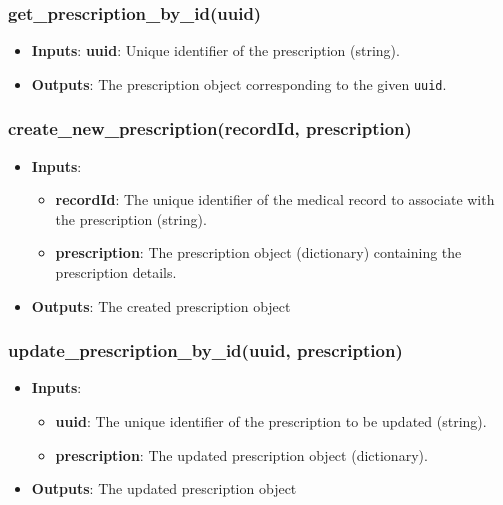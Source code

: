 \documentclass[12pt, titlepage]{article}
\begin{document}
\subsubsection{get\_prescription\_by\_id(uuid)}
\begin{itemize}
    \item \textbf{Inputs}: \textbf{uuid}: Unique identifier of the prescription (string).
    \item \textbf{Outputs}: The prescription object corresponding to the given \texttt{uuid}.
\end{itemize}

\subsubsection{create\_new\_prescription(recordId, prescription)}
\begin{itemize}
    \item \textbf{Inputs}:
        \begin{itemize}
            \item \textbf{recordId}: The unique identifier of the medical record to associate with the prescription (string).
            \item \textbf{prescription}: The prescription object (dictionary) containing the prescription details.
        \end{itemize}
    \item \textbf{Outputs}: The created prescription object
\end{itemize}

\subsubsection{update\_prescription\_by\_id(uuid, prescription)}
\begin{itemize}
    \item \textbf{Inputs}:
        \begin{itemize}
            \item \textbf{uuid}: The unique identifier of the prescription to be updated (string).
            \item \textbf{prescription}: The updated prescription object (dictionary).
        \end{itemize}
    \item \textbf{Outputs}: The updated prescription object
\end{itemize}
\end{document}
